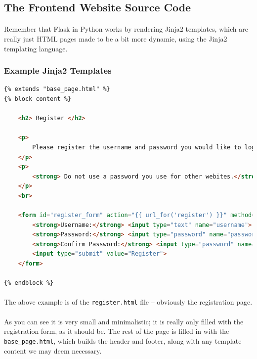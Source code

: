 \documentclass[11pt]{article}
\begin{document}
	\newpage

	\subsection{The Frontend Website Source Code} 

	\paragraph{} Remember that Flask in Python works by rendering Jinja2 templates, which are really just HTML pages made to be a bit more dynamic, using the Jinja2 templating language. 

	\subsubsection{Example Jinja2 Templates}

	\begin{lstlisting}[language=HTML]
{% extends "base_page.html" %}
{% block content %}

	<h2> Register </h2>

	<p>
		Please register the username and password you would like to log in with.
	</p>
	<p>
		<strong> Do not use a password you use for other webites.</strong> Your password is stored in the database as a <a href="https://en.wikipedia.org/wiki/SHA-2">SHA256 hash</a>, and it is still passed to the server over a secure <a href="https://en.wikipedia.org/wiki/HTTPS">HTTPS</a> connection, but the next line of defense is for you, the user, to never use synchronized passwords. 
	</p>
	<br>

	<form id="register_form" action="{{ url_for('register') }}" method="post">
		<strong>Username:</strong> <input type="text" name="username">
		<strong>Password:</strong> <input type="password" name="password">
		<strong>Confirm Password:</strong> <input type="password" name="confirm">
		<input type="submit" value="Register">
	</form>

{% endblock %}
\end{lstlisting}

	\paragraph{} The above example is of the \texttt{register.html} file -- obviously the registration page.

	\paragraph{} As you can see it is very small and minimalistic; it is really only filled with the registration form, as it should be. The rest of the page is filled in with the \texttt{base\_page.html}, which builds the header and footer, along with any template content we may deem necessary.
\end{document}
